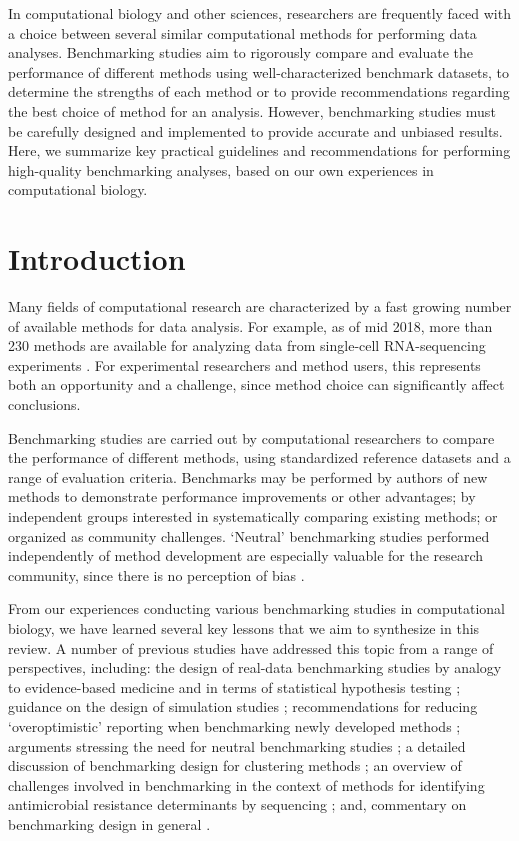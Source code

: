 \documentclass[12pt, a4paper]{article}
\begin{document}
In computational biology and other sciences, researchers are frequently faced with a choice between several similar computational methods for performing data analyses. Benchmarking studies aim to rigorously compare and evaluate the performance of different methods using well-characterized benchmark datasets, to determine the strengths of each method or to provide recommendations regarding the best choice of method for an analysis. However, benchmarking studies must be carefully designed and implemented to provide accurate and unbiased results. Here, we summarize key practical guidelines and recommendations for performing high-quality benchmarking analyses, based on our own experiences in computational biology.




\section*{Introduction}

Many fields of computational research are characterized by a fast growing number of available methods for data analysis. For example, as of mid 2018, more than 230 methods are available for analyzing data from single-cell RNA-sequencing experiments \citep{Zappia2018}. For experimental researchers and method users, this represents both an opportunity and a challenge, since method choice can significantly affect conclusions.

Benchmarking studies are carried out by computational researchers to compare the performance of different methods, using standardized reference datasets and a range of evaluation criteria. Benchmarks may be performed by authors of new methods to demonstrate performance improvements or other advantages; by independent groups interested in systematically comparing existing methods; or organized as community challenges. `Neutral' benchmarking studies performed independently of method development are especially valuable for the research community, since there is no perception of bias \citep{Boulesteix2018, Boulesteix2013}.

From our experiences conducting various benchmarking studies in computational biology, we have learned several key lessons that we aim to synthesize in this review. A number of previous studies have addressed this topic from a range of perspectives, including: the design of real-data benchmarking studies by analogy to evidence-based medicine \citep{Boulesteix2017} and in terms of statistical hypothesis testing \citep{Boulesteix2015b}; guidance on the design of simulation studies \citep{Morris2018}; recommendations for reducing `overoptimistic' reporting when benchmarking newly developed methods \citep{Boulesteix2015a}; arguments stressing the need for neutral benchmarking studies \citep{Boulesteix2013}; a detailed discussion of benchmarking design for clustering methods \citep{VanMechelen2018}; an overview of challenges involved in benchmarking in the context of methods for identifying antimicrobial resistance determinants by sequencing \citep{Angers-Loustau2018}; and, commentary on benchmarking design in general \citep{Zheng2017a}.
\end{document}
